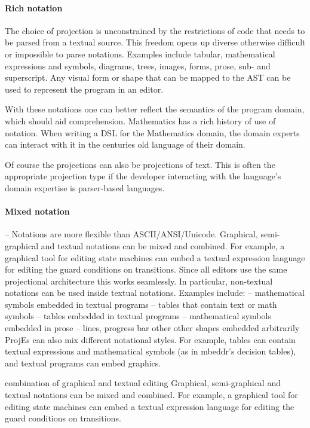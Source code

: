 \paragraph{Rich notation}
The choice of projection is unconstrained by the restrictions of code that needs to be parsed from a textual source.
This freedom opens up diverse otherwise difficult or impossible to parse notations.
Examples include tabular, mathematical expressions and symbols, diagrams, trees, images, forms, prose, sub- and superscript.
Any visual form or shape that can be mapped to the AST can be used to represent the program in an editor.

With these notations one can better reflect the semantics of the program domain, which should aid comprehension.
Mathematics has a rich history of use of notation.
When writing a DSL for the Mathematics domain, the domain experts can interact with it in the centuries old language of their domain. 

Of course the projections can also be projections of text.  
This is often the appropriate projection type if the developer interacting with the language's domain expertise is parser-based languages.

\paragraph{Mixed notation}
– Notations are more flexible than ASCII/ANSI/Unicode.
Graphical, semi-graphical and textual notations can be mixed and combined.
For example, a graphical tool for editing state machines can embed a textual expression language for editing the guard conditions on transitions.
Since all editors use the same projectional architecture this works seamlessly.
In particular, non-textual notations can be used inside textual notations.
Examples include:
– mathematical symbols embedded in textual programs – tables that contain text or math symbols – tables embedded in textual programs – mathematical symbols embedded in prose – lines, progress bar other other shapes embedded arbitrarily 
ProjEs can also mix different notational styles.
For example, tables can contain textual expressions and mathematical symbols (as in mbeddr’s decision tables), and textual programs can embed graphics.

combination of graphical and textual editing
Graphical, semi-graphical and textual notations can be mixed and combined.
For example, a graphical tool for editing state machines can embed a textual expression language for editing the guard conditions on transitions.


